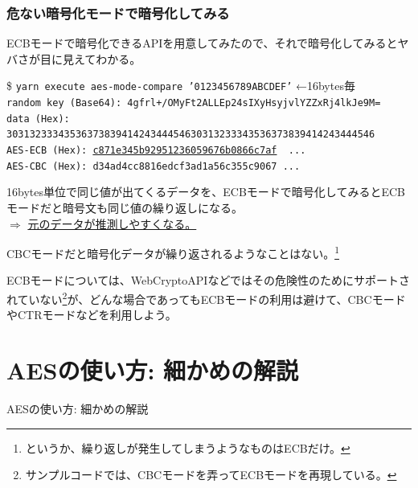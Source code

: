 \documentclass[12pt,dvipdfmx]{beamer}
\begin{document}
\begin{frame}
\frametitle{危ない暗号化モードで暗号化してみる}
ECBモードで暗号化できるAPIを用意してみたので、それで暗号化してみるとヤバさが目に見えてわかる。

\begin{exampleblock}{}
\scriptsize
\$ \texttt{yarn execute aes-mode-compare '\alert{0123456789ABCDEF}'} ←16bytes毎\\
\texttt{random key (Base64): 4gfrl+/OMyFt2ALLEp24sIXyHsyjvlYZZxRj4lkJe9M=}\\
\texttt{data (Hex): 3031323334353637383941424344454630313233343536373839414243444546}\\
\texttt{AES-ECB (Hex): \underline{\alert{c871e345b92951236059676b0866c7af}} \underline{} ...}\\
\texttt{AES-CBC (Hex): \alert{d34ad4cc8816edcf3ad1a56c355c9067}  ...}
\end{exampleblock}

16bytes単位で同じ値が出てくるデータを、ECBモードで暗号化してみると\alert{ECBモードだと暗号文も同じ値の繰り返しになる}。\\
$\Rightarrow$ \underline{元のデータが推測しやすくなる。}

\end{frame}

\begin{frame}
CBCモードだと暗号化データが繰り返されるようなことはない。\footnote[frame]{というか、繰り返しが発生してしまうようなものはECBだけ。}

\vspace{3ex}
ECBモードについては、WebCryptoAPIなどではその危険性のためにサポートされていない\footnote[frame]{サンプルコードでは、CBCモードを弄ってECBモードを再現している。}が、\alert{どんな場合であってもECBモードの利用は避けて}、CBCモードやCTRモードなどを利用しよう。
\end{frame}


\section{AESの使い方: 細かめの解説}
\begin{frame}
\centering
{\Large AESの使い方: 細かめの解説}
\end{frame}
\end{document}
